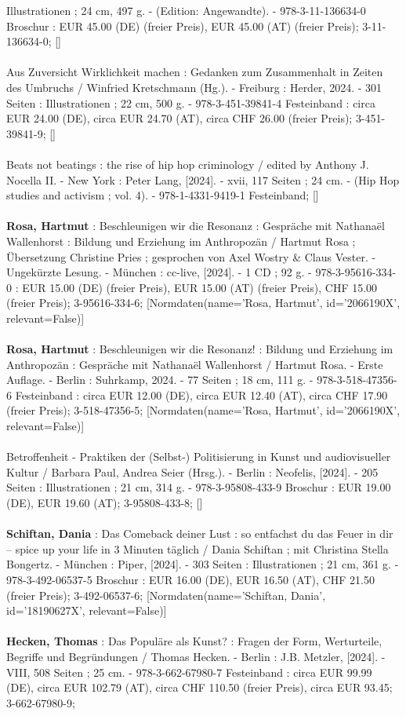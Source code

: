 \documentclass{article}
\begin{document}
\begin{multicols}{3}
Illustrationen ; 24 cm, 497 g. - (Edition: Angewandte). - 978-3-11-136634-0 Broschur : EUR 45.00 (DE) (freier Preis), EUR 45.00 (AT) (freier Preis); 3-11-136634-0; []\\\\Aus Zuversicht Wirklichkeit machen : Gedanken zum Zusammenhalt in Zeiten des Umbruchs / Winfried Kretschmann (Hg.). - Freiburg : Herder, 2024. - 301 Seiten : Illustrationen ; 22 cm, 500 g. - 978-3-451-39841-4 Festeinband : circa EUR 24.00 (DE), circa EUR 24.70 (AT), circa CHF 26.00 (freier Preis); 3-451-39841-9; []\\\\Beats not beatings : the rise of hip hop criminology / edited by Anthony J. Nocella II. - New York : Peter Lang, [2024]. - xvii, 117 Seiten ; 24 cm. - (Hip Hop studies and activism ; vol. 4). - 978-1-4331-9419-1 Festeinband; []\\\\\textbf{Rosa, Hartmut} : Beschleunigen wir die Resonanz : Gespräche mit Nathanaël Wallenhorst : Bildung und Erziehung im Anthropozän / Hartmut Rosa ; Übersetzung Christine Pries ; gesprochen von Axel Wostry \& Claus Vester. - Ungekürzte Lesung. - München : cc-live, [2024]. - 1 CD ; 92 g. - 978-3-95616-334-0 : EUR 15.00 (DE) (freier Preis), EUR 15.00 (AT) (freier Preis), CHF 15.00 (freier Preis); 3-95616-334-6; [Normdaten(name='Rosa, Hartmut', id='2066190X', relevant=False)]\\\\\textbf{Rosa, Hartmut} : Beschleunigen wir die Resonanz! : Bildung und Erziehung im Anthropozän : Gespräche mit Nathanaël Wallenhorst / Hartmut Rosa. - Erste Auflage. - Berlin : Suhrkamp, 2024. - 77 Seiten ; 18 cm, 111 g. - 978-3-518-47356-6 Festeinband : circa EUR 12.00 (DE), circa EUR 12.40 (AT), circa CHF 17.90 (freier Preis); 3-518-47356-5; [Normdaten(name='Rosa, Hartmut', id='2066190X', relevant=False)]\\\\Betroffenheit - Praktiken der (Selbst-) Politisierung in Kunst und audiovisueller Kultur / Barbara Paul, Andrea Seier (Hrsg.). - Berlin : Neofelis, [2024]. - 205 Seiten : Illustrationen ; 21 cm, 314 g. - 978-3-95808-433-9 Broschur : EUR 19.00 (DE), EUR 19.60 (AT); 3-95808-433-8; []\\\\\textbf{Schiftan, Dania} : Das Comeback deiner Lust : so entfachst du das Feuer in dir – spice up your life in 3 Minuten täglich / Dania Schiftan ; mit Christina Stella Bongertz. - München : Piper, [2024]. - 303 Seiten : Illustrationen ; 21 cm, 361 g. - 978-3-492-06537-5 Broschur : EUR 16.00 (DE), EUR 16.50 (AT), CHF 21.50 (freier Preis); 3-492-06537-6; [Normdaten(name='Schiftan, Dania', id='18190627X', relevant=False)]\\\\\textbf{Hecken, Thomas} : Das Populäre als Kunst? : Fragen der Form, Werturteile, Begriffe und Begründungen / Thomas Hecken. - Berlin : J.B. Metzler, [2024]. - VIII, 508 Seiten ; 25 cm. - 978-3-662-67980-7 Festeinband : circa EUR 99.99 (DE), circa EUR 102.79 (AT), circa CHF 110.50 (freier Preis), circa EUR 93.45; 3-662-67980-9; 
\end{multicols}
\end{document}
